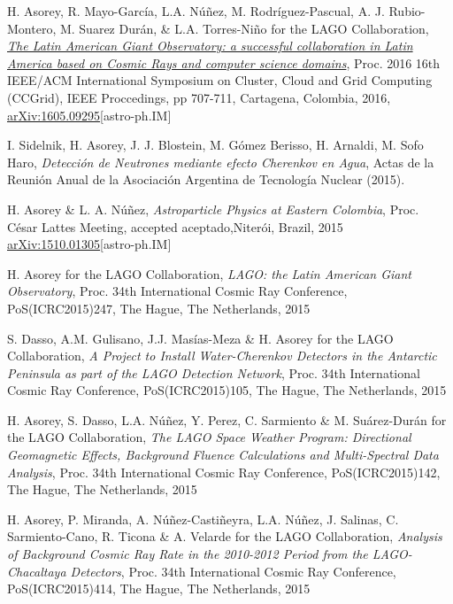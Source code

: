 \begin{etaremune}
\item {} H. Asorey, R. Mayo-García, L.A. Núñez, M. Rodríguez-Pascual, A. J. Rubio-Montero, M. Suarez Durán, \& L.A. Torres-Niño for the LAGO Collaboration, {\emph{\href{http://dx.doi.org/10.1109/CCGrid.2016.110}{The Latin American Giant Observatory: a successful collaboration in Latin America based on Cosmic Rays and computer science domains}}}, \en Proc. 2016 16th IEEE/ACM International Symposium on Cluster, Cloud and Grid Computing (CCGrid), IEEE Proccedings, pp 707-711, Cartagena, Colombia, 2016, \href{http://arxiv.org/abs/1605.09295}{arXiv:1605.09295}[astro-ph.IM] 

\item {} I. Sidelnik, H. Asorey, J. J. Blostein, M. Gómez Berisso, H. Arnaldi, M. Sofo Haro, {\emph{Detección de Neutrones mediante efecto Cherenkov en Agua}}, Actas de la Reunión Anual de la Asociación Argentina de Tecnología Nuclear (2015).

\item {}H. Asorey \& L. A. Núñez, {\emph{Astroparticle Physics at Eastern Colombia}}, \en Proc. César Lattes Meeting, \ifeng accepted \else aceptado,\fi Niterói, Brazil, 2015 \href{http://arxiv.org/abs/1510.01305}{arXiv:1510.01305}[astro-ph.IM]

\item {}H. Asorey for the LAGO Collaboration, {\emph{LAGO: the Latin American Giant Observatory}}, \en Proc. 34th International Cosmic Ray Conference, PoS(ICRC2015)247, The Hague, The Netherlands, 2015

\item {}S. Dasso, A.M. Gulisano, J.J. Masías-Meza \& H. Asorey for the LAGO Collaboration, {\emph{A Project to Install Water-Cherenkov Detectors in the Antarctic Peninsula as part of the LAGO Detection Network}}, \en Proc. 34th International Cosmic Ray Conference, PoS(ICRC2015)105, The Hague, The Netherlands, 2015

\item {}H. Asorey, S. Dasso, L.A. Núñez, Y. Perez, C. Sarmiento \& M. Suárez-Durán for the LAGO Collaboration, {\emph{The LAGO Space Weather Program: Directional Geomagnetic Effects, Background Fluence Calculations and Multi-Spectral Data Analysis}}, \en Proc. 34th International Cosmic Ray Conference, PoS(ICRC2015)142, The Hague, The Netherlands, 2015

\item {}H. Asorey, P. Miranda, A. Núñez-Castiñeyra, L.A. Núñez, J. Salinas, C. Sarmiento-Cano, R. Ticona \& A. Velarde for the LAGO Collaboration, {\emph{Analysis of Background Cosmic Ray Rate in the 2010-2012 Period from the LAGO-Chacaltaya Detectors}}, \en Proc. 34th International Cosmic Ray Conference, PoS(ICRC2015)414, The Hague, The Netherlands, 2015


\end{etaremune}
